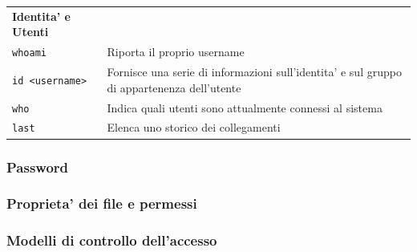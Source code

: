 \begin{center}
	\begin{tabular}{ll}
	\textbf{Identita' e Utenti} & \\
	\texttt{whoami} & Riporta il proprio username \\
	\texttt{id <username>} & Fornisce una serie di informazioni sull'identita' e sul gruppo di appartenenza dell'utente\\
	\texttt{who} & Indica quali utenti sono attualmente connessi al sistema\\
	\texttt{last} & Elenca uno storico dei collegamenti \\
	\end{tabular}
\end{center}

\subsubsection{Password}
\subsubsection{Proprieta' dei file e permessi}
\subsubsection{Modelli di controllo dell'accesso}


